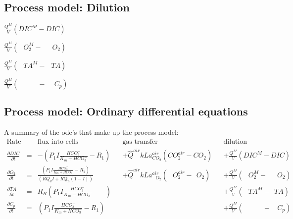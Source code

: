 \documentclass{ruthesis}
\begin{document}
\subsection{Process model: Dilution}

$ \frac{Q^M}{V}(DIC^{M} - DIC) $

$ \frac{Q^M}{V}(\phantom{C}O_{2}^{M} - \phantom{CC}O_{2}) $

$ \frac{Q^M}{V}(\phantom{C}TA^{M} - \phantom{C}TA) $

$ \frac{Q^M}{V}(\phantom{CTA^{M}} - \phantom{IC}C_p) $



\subsection{Process model: Ordinary differential equations}\label{sec:micro_process_model}

A summary of the ode's that make up the process model:
\begin{align}
\text{Rate} & & \text{flux into cells}            &            &\text{gas transfer}   &     & \text{dilution} \nonumber                              \\
\frac{\partial DIC}{\partial t}&=&                      - (P_1 I \frac{HCO_3^-}{K_m + HCO_3^-} - R_1)&      &+\hat Q^{air}kLa_{ CO_2}^{air}(CO_{2}^{air} - CO_{2})                  & &+\frac{Q^M}{V}(DIC^{M} - DIC)       \nonumber \\
\frac{\partial O_2}{\partial t}&=& \frac{(P_1 I \frac{HCO_3^-}{K_m + HCO_3^-} - R_1)}{(RQ_d I + RQ_n(1-I))}  &      &+\hat Q^{air}kLa_{\phantom{C}O_2}^{air}(\phantom{C}O_{2}^{air} - \phantom{I}O_{2}) && +\frac{Q^M}{V}(\phantom{C}O_{2}^{M} - \phantom{CC}O_{2})     \nonumber   \\
\frac{\partial TA}{\partial t} & =&      R_R (P_1 I \frac{HCO_3^-}{K_m + HCO_3^-} \phantom{ + R_1})& & & & +\frac{Q^M}{V}(\phantom{C}TA^{M} - \phantom{I}TA) \nonumber\\
\frac{\partial C_p}{\partial t} & =& (P_1 I \frac{HCO_3^-}{K_m + HCO_3^-} - R_1)&  & & & +\frac{Q^M}{V}(\phantom{CTA^{M}} - \phantom{II}C_p) 
\end{align}
\end{document}
